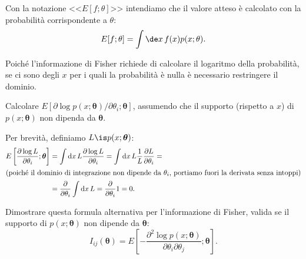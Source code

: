 Con la notazione <<$E[f;\theta]$>> intendiamo che
il valore atteso è calcolato con la probabilità corrispondente a $\theta$:
\begin{equation*}
	E[f;\theta] = \int \de x\, f(x) p(x;\theta).
\end{equation*}

Poiché l'informazione di Fisher richiede di calcolare il logaritmo della
probabilità, se ci sono degli $x$ per i quali la probabilità è nulla è
necessario restringere il dominio.

\begin{exercise}
    Calcolare $E[\partial\log
    p(x;\boldsymbol\theta)/\partial\theta_i;\boldsymbol\theta]$, assumendo che
    il supporto (rispetto a $x$) di $p(x;\boldsymbol\theta)$ non dipenda da
    $\boldsymbol\theta$.
\end{exercise}

\begin{solution}
    Per brevità, definiamo $L \is p(x;\boldsymbol\theta)$:
    \begin{align*}
        E\left[\frac{\partial\log L}{\partial\theta_i};\boldsymbol\theta\right]
        &= \int\mathrm dx\, L \frac{\partial\log L}{\partial\theta_i}
        = \int\mathrm dx\, L\frac1L \frac{\partial L}{\partial\theta_i} = \\
        \intertext{(poiché il dominio di integrazione non dipende da
        $\theta_i$, portiamo fuori la derivata senza intoppi)}
        &= \frac\partial{\partial\theta_i} \int\mathrm dx\, L
        = \frac\partial{\partial\theta_i} 1
        = 0.
    \end{align*}
\end{solution}

\begin{exercise}
    Dimostrare questa formula alternativa per l'informazione di Fisher, valida
    se il supporto di $p(x;\boldsymbol\theta)$ non dipende da
    $\boldsymbol\theta$:
    \begin{equation*}
        I_{ij}(\boldsymbol\theta) =
        E \left[-\frac
        {\partial^2\log p(x;\boldsymbol\theta)}
        {\partial\theta_i\partial\theta_j};\boldsymbol\theta \right].
    \end{equation*}
\end{exercise}

